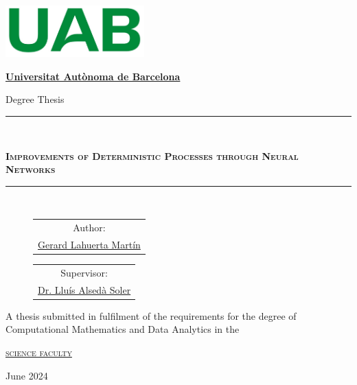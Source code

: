 \documentclass[a4paper, 11pt]{article}
\begin{document}
\pagestyle{plain}

\begin{titlepage}
    \centering
    {\includegraphics[width=0.4\textwidth]{PORTADA/UAB.png}\par}
    \vspace{1cm}
    {\bfseries\LARGE \href{https://www.uab.cat/}{Universitat Autònoma de Barcelona} \par}
    \vspace{2cm}
    {\Large Degree Thesis \par}
    \vspace{2em}
    \rule{\linewidth}{0.4pt}\\
    \vspace{1cm}
    {\scshape\Huge \textbf{Improvements of Deterministic Processes through Neural Networks} \par}
    \vspace{1cm}
    \rule{\linewidth}{0.4pt}\\
    \vspace{2cm}
    {\Large
    \begin{figure}[h]
    \centering
        \begin{minipage}{5cm} \centering %
            \begin{tabular}{c}
                Author: \\
                \href{https://github.com/Gerard-Lahuerta}{Gerard Lahuerta Martín}
            \end{tabular}
        \end{minipage}
        \hspace{3em}
        \begin{minipage}{5cm} \centering %
            \begin{tabular}{c}
                Supervisor: \\
                \href{https://mat.uab.cat/~alseda/}{Dr. Lluís Alsedà Soler}
            \end{tabular}
        \end{minipage}
    \end{figure}\par}
    \vspace{2cm}
    {\scshape 
        \begin{minipage}{10cm} \centering %
            A thesis submitted in fulfilment of the requirements
            for the degree of Computational Mathematics and Data Analytics in the
        \end{minipage} 
    \par} 
    \vspace{2em}
    {\scshape\Large \href{https://www.uab.cat/ciencies}{science faculty} \par}
    \vfill
    {\Large June 2024 \par}
\end{titlepage}
\end{document}
